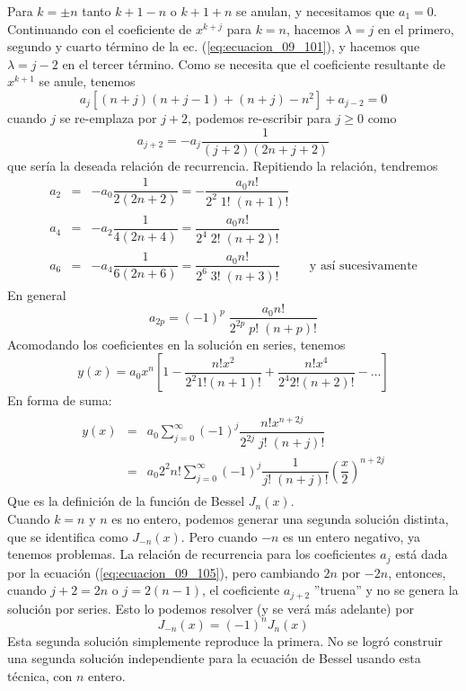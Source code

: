 Para $k = \pm n$ tanto $k + 1 -n$ o $k + 1 + n$ se anulan, y necesitamos que $a_{1} = 0$.
\\
Continuando con el coeficiente de $x^{k+j}$ para $k=n$, hacemos $\lambda=j$ en el primero, segundo y cuarto término de la ec. (\ref{eq:ecuacion_09_101}), y hacemos que $\lambda = j -2$ en el tercer término. Como se necesita que el coeficiente resultante de $x^{k+1}$ se anule, tenemos
\[ a_{j} [(n + j)(n + j - 1) + (n + j) - n^{2}] + a_{j-2} = 0 \]
cuando $j$ se re-emplaza por $j+2$, podemos re-escribir para $j \geq 0$ como
\begin{equation}
a_{j+2} = - a_{j} \dfrac{1}{(j+2)(2n + j +2)}
\label{eq:ecuacion_09_105}
\end{equation}
que sería la deseada relación de recurrencia. Repitiendo la relación, tendremos
\begin{eqnarray*}
a_{2} &=& - a_{0} \dfrac{1}{2(2n + 2)} = - \dfrac{a_{0} n!}{2^{2} \; 1! \; (n+1)!} \nonumber \\
a_{4} &=& - a_{2} \dfrac{1}{4(2n + 4)} =  \dfrac{a_{0} n!}{2^{4} \; 2! \; (n+2)!} \nonumber \\
a_{6} &=& - a_{4} \dfrac{1}{6(2n + 6)} =  \dfrac{a_{0} n!}{2^{6} \; 3! \; (n+3)!} \hspace{1cm}\mbox{y así sucesivamente} \nonumber
\end{eqnarray*}
En general
\begin{equation}
a_{2p} = (-1)^{p} \; \dfrac{a_{0} n!}{2^{2p} \; p! \; (n+p)!}
\label{eq:ecuacion_09_106}
\end{equation}
Acomodando los coeficientes en la solución en series, tenemos
\begin{equation}
y(x) = a_{0} x^{n} \left[ 1 - \dfrac{n! x^{2}}{2^{2} 1! (n+1)!} + \dfrac{n! x^{4}}{2^{4} 2! (n+2)!} - \ldots \right]
\label{eq:ecuacion_09_107}
\end{equation}
En forma de suma:
\begin{eqnarray*}
\begin{aligned}
y(x) &=& a_{0} \sum_{j=0}^{\infty} (-1)^{j} \dfrac{n! x^{n+2j}}{2^{2j} \; j! \; (n+j)!} \nonumber \\
&=& a_{0} 2^{2} n! \sum_{j=0}^{\infty} (-1)^{j} \dfrac{1}{j! \; (n+j)!} \left( \dfrac{x}{2} \right)^{n+2j} 
\end{aligned}	
\label{eq:ecucion_09_108}  
\end{eqnarray*}
Que es la definición de la función de Bessel $J_{n}(x)$.
\\
Cuando $k=n$ y $n$ es no entero, podemos generar una segunda solución distinta, que se identifica como $J_{-n}(x)$. Pero cuando $-n$ es un entero negativo, ya tenemos problemas. La relación de recurrencia para los coeficientes $a_{j}$ está dada por la ecuación (\ref{eq:ecuacion_09_105}), pero cambiando $2n$ por $-2n$, entonces, cuando $j+2=2n$ o $j=2(n-1)$, el coeficiente $a_{j+2}$ ''truena'' y no se genera la solución por series. Esto lo podemos resolver (y se verá más adelante) por 
\begin{equation}
J_{-n} (x) = (-1)^{n} J_{n}(x)
\label{eq:ecuacion_09_109}
\end{equation}
Esta segunda solución simplemente reproduce la primera. No se logró construir una segunda solución independiente para la ecuación de Bessel usando esta técnica, con $n$ entero.
